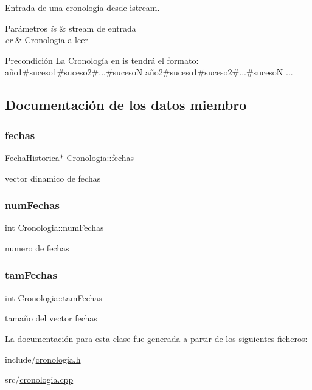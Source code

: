 Entrada de una cronología desde istream. 


\begin{DoxyParams}{Parámetros}
{\em is} & stream de entrada \\
\hline
{\em cr} & \hyperlink{classCronologia}{Cronologia} a leer \\
\hline
\end{DoxyParams}
\begin{DoxyPrecond}{Precondición}
La Cronología en is tendrá el formato\+: año1\#suceso1\#suceso2\#...\#sucesoN año2\#suceso1\#suceso2\#...\#sucesoN ... 
\end{DoxyPrecond}


\subsection{Documentación de los datos miembro}
\mbox{\label{classCronologia_a07e368866bedb6287af5787923ec31c7}} 
\subsubsection{\texorpdfstring{fechas}{fechas}}
{\footnotesize\ttfamily \hyperlink{classFechaHistorica}{Fecha\+Historica}$\ast$ Cronologia\+::fechas\hspace{0.3cm}{\ttfamily [private]}}

vector dinamico de fechas \mbox{\label{classCronologia_a26810731cb188a3a026586a248225496}} 
\subsubsection{\texorpdfstring{num\+Fechas}{numFechas}}
{\footnotesize\ttfamily int Cronologia\+::num\+Fechas\hspace{0.3cm}{\ttfamily [private]}}

numero de fechas \mbox{\label{classCronologia_a35e0a337270fea5091c74544b43b3898}} 
\subsubsection{\texorpdfstring{tam\+Fechas}{tamFechas}}
{\footnotesize\ttfamily int Cronologia\+::tam\+Fechas\hspace{0.3cm}{\ttfamily [private]}}

tamaño del vector fechas 

La documentación para esta clase fue generada a partir de los siguientes ficheros\+:\begin{DoxyCompactItemize}
\item 
include/\hyperlink{cronologia_8h}{cronologia.\+h}\item 
src/\hyperlink{cronologia_8cpp}{cronologia.\+cpp}\end{DoxyCompactItemize}
